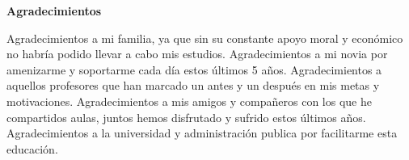 \thispagestyle{empty}

\begin{flushleft}
	\textbf{\LARGE Agradecimientos}\\
\end{flushleft}

\vspace{1cm}

\begin{flushleft}
	Agradecimientos a mi familia, ya que sin su constante apoyo moral y económico no habría podido llevar a cabo mis estudios.
	Agradecimientos a mi novia por amenizarme  y soportarme cada día estos últimos 5 años.
	Agradecimientos a aquellos profesores que han marcado un antes y un después en mis metas y motivaciones.
	Agradecimientos a mis amigos y compañeros con los que he compartidos aulas, juntos hemos disfrutado y sufrido estos últimos años. 
	Agradecimientos a la universidad y administración publica por facilitarme esta educación.
\end{flushleft}

\newpage %
